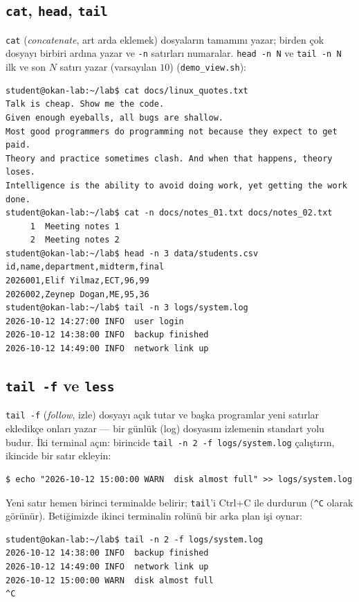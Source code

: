\documentclass[11pt,a4paper]{article}
\newcommand{\cmd}[1]{\texttt{#1}}
\begin{document}
\subsection{\texttt{cat}, \texttt{head}, \texttt{tail}}

\cmd{cat} (\emph{concatenate}, art arda eklemek) dosyaların tamamını yazar; birden çok dosyayı birbiri ardına yazar ve \cmd{-n} satırları numaralar. \cmd{head -n N} ve \cmd{tail -n N} ilk ve son $N$ satırı yazar (varsayılan $10$) (\cmd{demo\_view.sh}):

\begin{lstlisting}[style=term]
student@okan-lab:~/lab$ cat docs/linux_quotes.txt
Talk is cheap. Show me the code.
Given enough eyeballs, all bugs are shallow.
Most good programmers do programming not because they expect to get paid.
Theory and practice sometimes clash. And when that happens, theory loses.
Intelligence is the ability to avoid doing work, yet getting the work done.
student@okan-lab:~/lab$ cat -n docs/notes_01.txt docs/notes_02.txt
     1  Meeting notes 1
     2  Meeting notes 2
student@okan-lab:~/lab$ head -n 3 data/students.csv
id,name,department,midterm,final
2026001,Elif Yilmaz,ECT,96,99
2026002,Zeynep Dogan,ME,95,36
student@okan-lab:~/lab$ tail -n 3 logs/system.log
2026-10-12 14:27:00 INFO  user login
2026-10-12 14:38:00 INFO  backup finished
2026-10-12 14:49:00 INFO  network link up
\end{lstlisting}

\subsection{\texttt{tail -f} ve \texttt{less}}

\cmd{tail -f} (\emph{follow}, izle) dosyayı açık tutar ve başka programlar yeni satırlar ekledikçe onları yazar --- bir günlük (log) dosyasını izlemenin standart yolu budur. İki terminal açın: birincide \cmd{tail -n 2 -f logs/system.log} çalıştırın, ikincide bir satır ekleyin:
\begin{lstlisting}[style=term]
$ echo "2026-10-12 15:00:00 WARN  disk almost full" >> logs/system.log
\end{lstlisting}
Yeni satır hemen birinci terminalde belirir; \cmd{tail}'i Ctrl+C ile durdurun (\texttt{\^{}C} olarak görünür). Betiğimizde ikinci terminalin rolünü bir arka plan işi oynar:

\begin{lstlisting}[style=term]
student@okan-lab:~/lab$ tail -n 2 -f logs/system.log
2026-10-12 14:38:00 INFO  backup finished
2026-10-12 14:49:00 INFO  network link up
2026-10-12 15:00:00 WARN  disk almost full
^C
\end{lstlisting}
\end{document}
